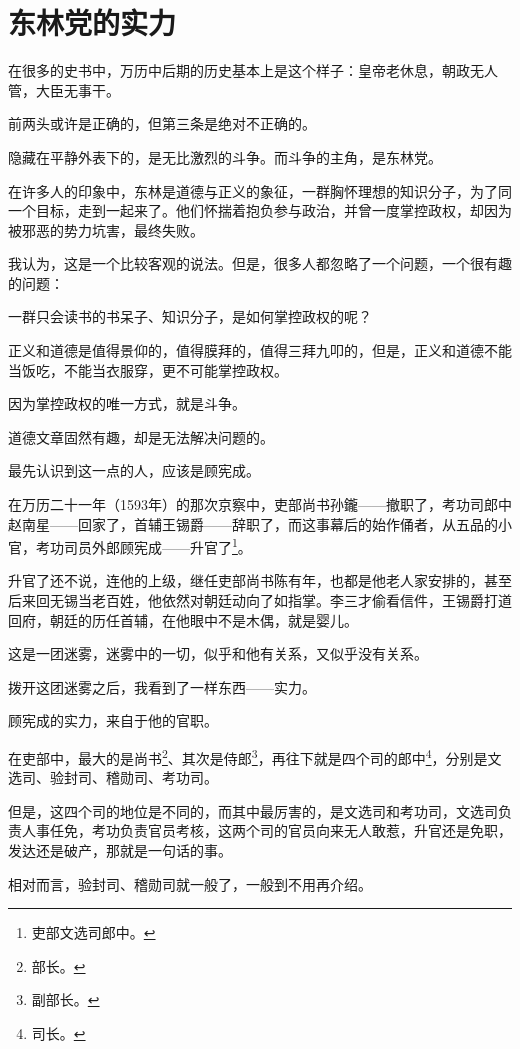 \section{东林党的实力}
\ifnum{}
	\begin{multicols}{\theparacolNo}
\fi
在很多的史书中，万历中后期的历史基本上是这个样子：皇帝老休息，朝政无人管，大臣无事干。

前两头或许是正确的，但第三条是绝对不正确的。

隐藏在平静外表下的，是无比激烈的斗争。而斗争的主角，是东林党。

在许多人的印象中，东林是道德与正义的象征，一群胸怀理想的知识分子，为了同一个目标，走到一起来了。他们怀揣着抱负参与政治，并曾一度掌控政权，却因为被邪恶的势力坑害，最终失败。

我认为，这是一个比较客观的说法。但是，很多人都忽略了一个问题，一个很有趣的问题：

一群只会读书的书呆子、知识分子，是如何掌控政权的呢？

正义和道德是值得景仰的，值得膜拜的，值得三拜九叩的，但是，正义和道德不能当饭吃，不能当衣服穿，更不可能掌控政权。

因为掌控政权的唯一方式，就是斗争。

道德文章固然有趣，却是无法解决问题的。

最先认识到这一点的人，应该是顾宪成。

在万历二十一年（1593年）的那次京察中，吏部尚书孙鑨——撤职了，考功司郎中赵南星——回家了，首辅王锡爵——辞职了，而这事幕后的始作俑者，从五品的小官，考功司员外郎顾宪成——升官了\footnote{吏部文选司郎中。}。

升官了还不说，连他的上级，继任吏部尚书陈有年，也都是他老人家安排的，甚至后来回无锡当老百姓，他依然对朝廷动向了如指掌。李三才偷看信件，王锡爵打道回府，朝廷的历任首辅，在他眼中不是木偶，就是婴儿。

这是一团迷雾，迷雾中的一切，似乎和他有关系，又似乎没有关系。

拨开这团迷雾之后，我看到了一样东西——实力。

顾宪成的实力，来自于他的官职。

在吏部中，最大的是尚书\footnote{部长。}、其次是侍郎\footnote{副部长。}，再往下就是四个司的郎中\footnote{司长。}，分别是文选司、验封司、稽勋司、考功司。

但是，这四个司的地位是不同的，而其中最厉害的，是文选司和考功司，文选司负责人事任免，考功负责官员考核，这两个司的官员向来无人敢惹，升官还是免职，发达还是破产，那就是一句话的事。

相对而言，验封司、稽勋司就一般了，一般到不用再介绍。


\end{multicols}

